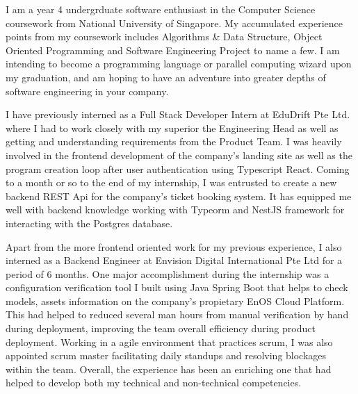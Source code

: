 \documentclass[11pt, a4paper]{awesome-cv}
\begin{document}
\makecvheader[R]


\makelettertitle

\begin{cvletter}

I am a year 4 undergrduate software enthusiast in the Computer Science coursework from National University of Singapore. My accumulated experience points from my coursework includes Algorithms \& Data Structure, Object Oriented Programming and Software Engineering Project to name a few. I am intending to become a programming language or parallel computing wizard upon my graduation, and am hoping to have an adventure into greater depths of software engineering in your company.

I have previously interned as a Full Stack Developer Intern at EduDrift Pte Ltd. where I had to work closely with my superior the Engineering Head as well as getting and understanding requirements from the Product Team. I was heavily involved in the frontend development of the company's landing site as well as the program creation loop after user authentication using Typescript React. Coming to a month or so to the end of my internship, I was entrusted to create a new backend REST Api for the company's ticket booking system. It has equipped me well with backend knowledge working with Typeorm and NestJS framework for interacting with the Postgres database.

Apart from the more frontend oriented work for my previous experience, I also interned as a Backend Engineer at Envision Digital International Pte Ltd for a period of 6 months. One major accomplishment during the internship was a configuration verification tool I built using Java Spring Boot that helps to check models, assets information on the company's propietary EnOS Cloud Platform. This had helped to reduced several man hours from manual verification by hand during deployment, improving the team overall efficiency during product deployment. Working in a agile environment that practices scrum, I was also appointed scrum master facilitating daily standups and resolving blockages within the team. Overall, the experience has been an enriching one that had helped to develop both my technical and non-technical competencies.


\end{cvletter}
\end{document}
